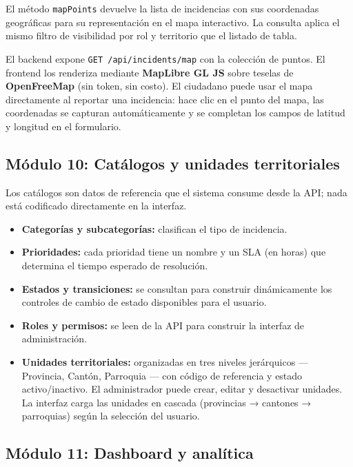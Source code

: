 \documentclass[12pt,a4paper]{article}
\begin{document}
El método \texttt{mapPoints} devuelve la lista de incidencias con sus coordenadas
geográficas para su representación en el mapa interactivo. La consulta aplica
el mismo filtro de visibilidad por rol y territorio que el listado de tabla.

El backend expone \texttt{GET /api/incidents/map} con la colección de puntos.
El frontend los renderiza mediante \textbf{MapLibre GL JS} sobre teselas de
\textbf{OpenFreeMap} (sin token, sin costo). El ciudadano puede usar el mapa
directamente al reportar una incidencia: hace clic en el punto del mapa, las
coordenadas se capturan automáticamente y se completan los campos de latitud y
longitud en el formulario.

\subsection{Módulo 10: Catálogos y unidades territoriales}

Los catálogos son datos de referencia que el sistema consume desde la API;
nada está codificado directamente en la interfaz.

\begin{itemize}
    \item \textbf{Categorías y subcategorías:} clasifican el tipo de incidencia.
    \item \textbf{Prioridades:} cada prioridad tiene un nombre y un SLA
          (en horas) que determina el tiempo esperado de resolución.
    \item \textbf{Estados y transiciones:} se consultan para construir dinámicamente
          los controles de cambio de estado disponibles para el usuario.
    \item \textbf{Roles y permisos:} se leen de la API para construir la interfaz
          de administración.
    \item \textbf{Unidades territoriales:} organizadas en tres niveles jerárquicos
          --- Provincia, Cantón, Parroquia --- con código de referencia y estado
          activo/inactivo. El administrador puede crear, editar y desactivar
          unidades. La interfaz carga las unidades en cascada (provincias →
          cantones → parroquias) según la selección del usuario.
\end{itemize}

\subsection{Módulo 11: Dashboard y analítica}
\end{document}
